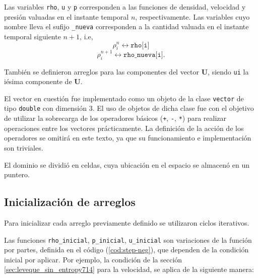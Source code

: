 Las variables \texttt{rho}, \texttt{u} y \texttt{p} corresponden a las funciones de densidad, velocidad y presión valuadas en el instante temporal $n$, respectivamente. Las variables cuyo nombre lleva el sufijo \texttt{\_nueva} corresponden a la cantidad valuada en el instante temporal siguiente $n+1$, i.e,
\begin{equation}
	\rho_{i}^{n} \leftrightarrow \texttt{rho[i]}
\end{equation}
\begin{equation}
	\rho_{i}^{n+1} \leftrightarrow \texttt{rho\_nueva[i]}.
\end{equation}

También se definieron arreglos para las componentes del vector $\mathbf{{U}}$, siendo \texttt{ui} la iésima componente de $\mathbf{{U}}$.


El vector en cuestión fue implementado como un objeto de la clase \texttt{vector} de tipo \texttt{double} con dimensión 3. El uso de objetos de dicha clase fue con el objetivo de utilizar la sobrecarga de los operadores básicos (\texttt{+}, \texttt{-}, \texttt{*}) para realizar operaciones entre los vectores prácticamente. La definición de la acción de los operadores se omitirá en este texto, ya que su funcionamiento e implementación son triviales. 


El dominio se dividió en celdas, cuya ubicación en el espacio se almacenó en un puntero.

\subsection{Inicialización de arreglos}
Para inicializar cada arreglo previamente definido se utilizaron ciclos iterativos.


Las funciones \texttt{rho\_inicial}, \texttt{p\_inicial}, \texttt{u\_inicial} son variaciones de la función por partes, definida en el código (\ref{cod:step-neg}), que dependen de la condición inicial por aplicar. Por ejemplo, la condición de  la sección \ref{sec:leveque_sin_entropy714} para la velocidad, se aplica de la siguiente manera:


